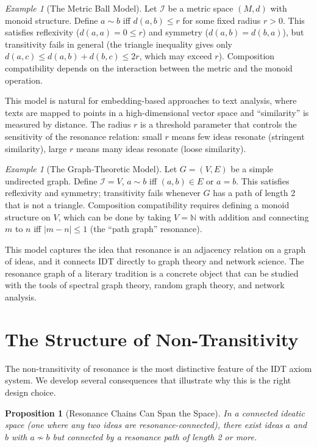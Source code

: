 \documentclass[11pt,openany]{book}
\theoremstyle{definition}
\theoremstyle{plain}
\newtheorem{proposition}[axiom]{Proposition}
\theoremstyle{remark}
\newtheorem{example}[axiom]{Example}
\newcommand{\IS}{\mathcal{I}}               %
\newcommand{\res}{\sim}                      %
\begin{document}
\begin{example}[The Metric Ball Model]
Let $\IS$ be a metric space $(M, d)$ with monoid structure. Define $a \res b$ iff $d(a, b) \leq r$ for some fixed radius $r > 0$. This satisfies reflexivity ($d(a, a) = 0 \leq r$) and symmetry ($d(a, b) = d(b, a)$), but transitivity fails in general (the triangle inequality gives only $d(a, c) \leq d(a, b) + d(b, c) \leq 2r$, which may exceed $r$). Composition compatibility depends on the interaction between the metric and the monoid operation.

This model is natural for embedding-based approaches to text analysis, where texts are mapped to points in a high-dimensional vector space and ``similarity'' is measured by distance. The radius $r$ is a threshold parameter that controls the sensitivity of the resonance relation: small $r$ means few ideas resonate (stringent similarity), large $r$ means many ideas resonate (loose similarity).
\end{example}

\begin{example}[The Graph-Theoretic Model]
Let $G = (V, E)$ be a simple undirected graph. Define $\IS = V$, $a \res b$ iff $(a, b) \in E$ or $a = b$. This satisfies reflexivity and symmetry; transitivity fails whenever $G$ has a path of length 2 that is not a triangle. Composition compatibility requires defining a monoid structure on $V$, which can be done by taking $V = \mathbb{N}$ with addition and connecting $m$ to $n$ iff $|m - n| \leq 1$ (the ``path graph'' resonance).

This model captures the idea that resonance is an adjacency relation on a graph of ideas, and it connects IDT directly to graph theory and network science. The resonance graph of a literary tradition is a concrete object that can be studied with the tools of spectral graph theory, random graph theory, and network analysis.
\end{example}

\section{The Structure of Non-Transitivity}

The non-transitivity of resonance is the most distinctive feature of the IDT axiom system. We develop several consequences that illustrate why this is the right design choice.

\begin{proposition}[Resonance Chains Can Span the Space]
In a connected ideatic space (one where any two ideas are resonance-connected), there exist ideas $a$ and $b$ with $a \not\res b$ but connected by a resonance path of length 2 or more.
\end{proposition}
\end{document}

